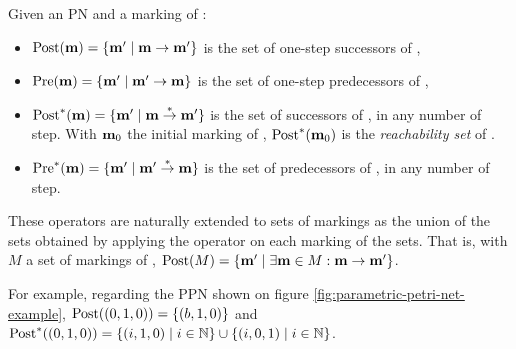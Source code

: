 \begin{defi}
  Given an \ac{PN} \NPT and a marking \marq of \tupleN:
  \begin{itemize}
    \item $\operatorname{Post}(\mathbf{m}) = \{\mathbf{m'} \mid \mathbf{m} \rightarrow \mathbf{m'}\}$ is the set of one-step successors of \marq,
    \item $\operatorname{Pre}(\mathbf{m}) = \{\mathbf{m'} \mid \mathbf{m'} \rightarrow \mathbf{m}\}$ is the set of one-step predecessors of \marq,
    \item $\operatorname{Post}^*(\mathbf{m}) = \{\mathbf{m'} \mid \mathbf{m} \stackrel{*}{\to} \mathbf{m'}\}$ is the set of successors of \marq, in any number of step.
      With $\mathbf{m}_0$ the initial marking of \tupleN, $\operatorname{Post}^*(\mathbf{m}_0)$ is the \emph{reachability set} of \tupleN.
    \item $\operatorname{Pre}^*(\mathbf{m}) = \{\mathbf{m'} \mid \mathbf{m'} \stackrel{*}{\to} \mathbf{m}\}$ is the set of predecessors of \marq, in any number of step.
  \end{itemize}
\end{defi}

These operators are naturally extended to sets of markings as the union of the sets obtained by applying the operator on each marking of the sets.
That is, with $M$ a set of markings of \tupleN,
$\operatorname{Post}(M) = \{\mathbf{m'} \mid \exists \mathbf{m} \in M : \mathbf{m} \rightarrow \mathbf{m'}\}$.

For example, regarding the \ac{PPN} shown on figure \ref{fig:parametric-petri-net-example},
$\operatorname{Post}((0,1,0)) = \{(b, 1, 0)\}$
and
$\operatorname{Post}^*((0,1,0)) = \{(i, 1, 0) \mid i \in \mathbb{N}\} \cup \{(i, 0, 1) \mid i \in \mathbb{N}\}$.

